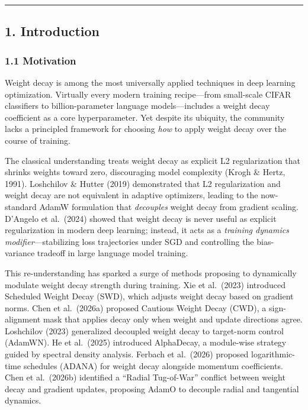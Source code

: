 \documentclass[
]{article}
\begin{document}
\begin{center}\rule{0.5\linewidth}{0.5pt}\end{center}

\hypertarget{introduction}{%
\subsection{1. Introduction}\label{introduction}}

\hypertarget{motivation}{%
\subsubsection{1.1 Motivation}\label{motivation}}

Weight decay is among the most universally applied techniques in deep
learning optimization. Virtually every modern training recipe---from
small-scale CIFAR classifiers to billion-parameter language
models---includes a weight decay coefficient as a core hyperparameter.
Yet despite its ubiquity, the community lacks a principled framework for
choosing \emph{how} to apply weight decay over the course of training.

The classical understanding treats weight decay as explicit L2
regularization that shrinks weights toward zero, discouraging model
complexity (Krogh \& Hertz, 1991). Loshchilov \& Hutter (2019)
demonstrated that L2 regularization and weight decay are not equivalent
in adaptive optimizers, leading to the now-standard AdamW formulation
that \emph{decouples} weight decay from gradient scaling. D'Angelo et
al.~(2024) showed that weight decay is never useful as explicit
regularization in modern deep learning; instead, it acts as a
\emph{training dynamics modifier}---stabilizing loss trajectories under
SGD and controlling the bias-variance tradeoff in large language model
training.

This re-understanding has sparked a surge of methods proposing to
dynamically modulate weight decay strength during training. Xie et
al.~(2023) introduced Scheduled Weight Decay (SWD), which adjusts weight
decay based on gradient norms. Chen et al.~(2026a) proposed Cautious
Weight Decay (CWD), a sign-alignment mask that applies decay only when
weight and update directions agree. Loshchilov (2023) generalized
decoupled weight decay to target-norm control (AdamWN). He et al.~(2025)
introduced AlphaDecay, a module-wise strategy guided by spectral density
analysis. Ferbach et al.~(2026) proposed logarithmic-time schedules
(ADANA) for weight decay alongside momentum coefficients. Chen et
al.~(2026b) identified a ``Radial Tug-of-War'' conflict between weight
decay and gradient updates, proposing AdamO to decouple radial and
tangential dynamics.
\end{document}
